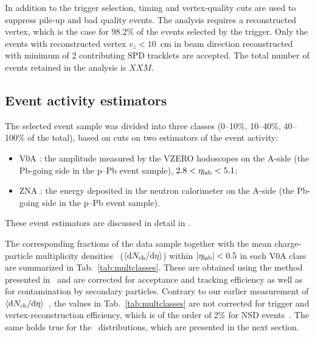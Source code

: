 In addition to the trigger selection,  timing and vertex-quality cuts are used to suppress pile-up and bad quality events. The analysis
requires a reconstructed vertex, which is the case for
98.2\% of the events selected by the trigger.
Only the events with reconstructed vertex $v_{z}<10$~cm in beam direction reconstructed with minimum of 2 contributing SPD tracklets are accepted. The total number of events retained in the analysis is $XX M$.


\subsection{Event activity estimators}

The selected event sample was divided into three classes (0--10\%, 10--40\%, 40--100\% of the total), based on cuts on two estimators of the event activity:
\begin{itemize}
\item V0A : the amplitude measured by the VZERO hodoscopes on the A-side (the Pb-going side in the p–Pb event sample), $2.8 < \eta_{\rm lab} < 5.1$;
\item ZNA : the energy deposited in the neutron calorimeter on the A-side (the Pb-going side in the p–Pb event sample).
\end{itemize}
These event estimators are discussed in detail in \cite{Adam:2014qja}.


The corresponding fractions of the data sample together with the mean charge-particle multiplicity densities ~($\left\langle\mathrm{d}N_\mathrm{ch}/\mathrm{d}\eta\right\rangle$) within $| \eta_{\rm lab} |<0.5$ in each V0A class are summarized in Tab.~\ref{tab:multclasses}.  
These are obtained using the method presented in~\cite{ALICE:2012xs} and are corrected for acceptance and
tracking efficiency as well as for contamination by secondary
particles. Contrary to our earlier measurement of $\left\langle\mathrm{d}N_\mathrm{ch}/\mathrm{d}\eta\right\rangle$~\cite{ALICE:2012xs}, the values
in Tab.~\ref{tab:multclasses} are not corrected for trigger and
vertex-reconstruction efficiency, which is of the order of 2\% for NSD
events~\cite{ALICE:2012xs}. The same holds true for the \pt\
distributions, which are presented in the next section.

